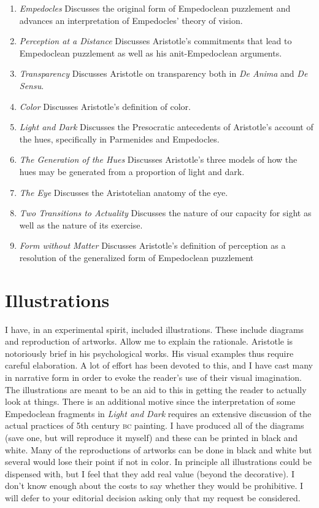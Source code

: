 \documentclass[12pt]{article}
\begin{document}
\begin{enumerate}
	\item \emph{Empedocles} Discusses the original form of Empedoclean puzzlement and advances an interpretation of Empedocles' theory of vision.
	\item \emph{Perception at a Distance} Discusses Aristotle's commitments that lead to Empedoclean puzzlement as well as his anit-Empedoclean arguments.
	\item \emph{Transparency} Discusses Aristotle on transparency both in \emph{De Anima} and \emph{De Sensu}.
	\item \emph{Color} Discusses Aristotle's definition of color.
	\item \emph{Light and Dark} Discusses the Presocratic antecedents of Aristotle's account of the hues, specifically in Parmenides and Empedocles.
	\item \emph{The Generation of the Hues} Discusses Aristotle's three models of how the hues may be generated from a proportion of light and dark.
	\item \emph{The Eye} Discusses the Aristotelian anatomy of the eye.
	\item \emph{Two Transitions to Actuality} Discusses the nature of our capacity for sight as well as the nature of its exercise.
	\item \emph{Form without Matter} Discusses Aristotle's definition of perception as a resolution of the generalized form of Empedoclean puzzlement
\end{enumerate}


\section{Illustrations} %
\label{sec:book_length_illustrations}

I have, in an experimental spirit, included illustrations. These include diagrams and reproduction of artworks. Allow me to explain the rationale. Aristotle is notoriously brief in his psychological works. His visual examples thus require careful elaboration. A lot of effort has been devoted to this, and I have cast many in narrative form in order to evoke the reader's use of their visual imagination. The illustrations are meant to be an aid to this in getting the reader to actually look at things. There is an additional motive since the interpretation of some Empedoclean fragments in \emph{Light and Dark} requires an extensive discussion of the actual practices of 5th century \textsc{bc} painting. I have produced all of the diagrams (save one, but will reproduce it myself) and these can be printed in black and white. Many of the reproductions of artworks can be done in black and white but several would lose their point if not in color. In principle all illustrations could be dispensed with, but I feel that they add real value (beyond the decorative). I don't know enough about the costs to say whether they would be prohibitive. I will defer to your editorial decision asking only that my request be considered.
\end{document}
